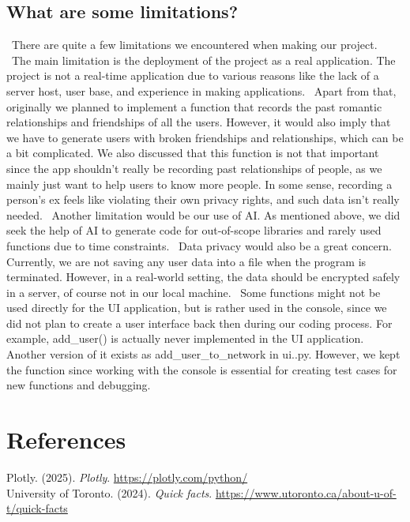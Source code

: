 \documentclass[fontsize=11pt]{article}
\begin{document}
\subsection{What are some limitations?} 
\ There are quite a few limitations we encountered when making our project. 
\ The main limitation is the deployment of the project as a real application. The project is not a real-time application due to various reasons like the lack of a server host, user base, and experience in making applications. 
\ Apart from that, originally we planned to implement a function that records the past romantic relationships and friendships of all the users. However, it would also imply that we have to generate users with broken friendships and relationships, which can be a bit complicated. We also discussed that this function is not that important since the app shouldn't really be recording past relationships of people, as we mainly just want to help users to know more people. In some sense, recording a person's ex feels like violating their own privacy rights, and such data isn't really needed.  
\ Another limitation would be our use of AI. As mentioned above, we did seek the help of AI to generate code for out-of-scope libraries and rarely used functions due to time constraints. 
\ Data privacy would also be a great concern. Currently, we are not saving any user data into a file when the program is terminated. However, in a real-world setting, the data should be encrypted safely in a server, of course not in our local machine. 
\ Some functions might not be used directly for the UI application, but is rather used in the console, since we did not plan to create a user interface back then during our coding process. For example, add_user() is actually never implemented in the UI application. Another version of it exists as add_user_to_network in ui..py. However, we kept the function since working with the console is essential for creating test cases for new functions and debugging.



\section*{References}

Plotly. (2025). \textit{Plotly}.
\url{https://plotly.com/python/}
\\
University of Toronto. (2024). \textit{Quick facts}.
\url{https://www.utoronto.ca/about-u-of-t/quick-facts}


\end{document}
